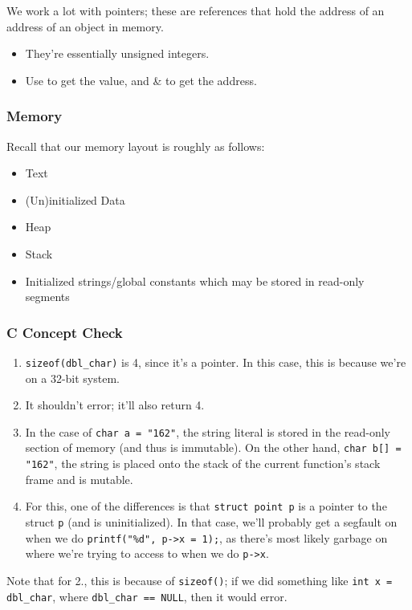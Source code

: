 \documentclass[openany]{book}
\begin{document}
We work a lot with pointers; these are references that hold the address of an address of an object in memory.
\begin{itemize}
	\item They're essentially unsigned integers.
	\item Use \* to get the value, and \& to get the address.
\end{itemize}

\subsubsection{Memory}
Recall that our memory layout is roughly as follows:
\begin{itemize}
	\item Text
	\item (Un)initialized Data
	\item Heap
	\item Stack
	\item Initialized strings/global constants which may be stored in read-only segments
\end{itemize}

\subsubsection{C Concept Check}
\begin{enumerate}
	\item \texttt{sizeof(\*dbl\_char)} is 4, since it's a pointer. In this case, this is because we're on a 32-bit system.
	\item It shouldn't error; it'll also return 4.
	\item In the case of \texttt{char\* a = "162"}, the string literal is stored in the read-only section of memory (and thus is immutable). On the other hand, \texttt{char b[] = "162"}, the string is placed onto the stack of the current function's stack frame and is mutable.
	\item For this, one of the differences is that \texttt{struct point\* p} is a pointer to the struct \texttt{p} (and is uninitialized). In that case, we'll probably get a segfault on when we do \texttt{printf("\%d", p->x = 1);}, as there's most likely garbage on where we're trying to access to when we do \texttt{p->x}.
\end{enumerate}

\begin{warn}
	Note that for 2., this is because of \texttt{sizeof()}; if we did something like \texttt{int x = \*dbl\_char}, where \texttt{dbl\_char == NULL}, then it would error.
\end{warn}
\end{document}
